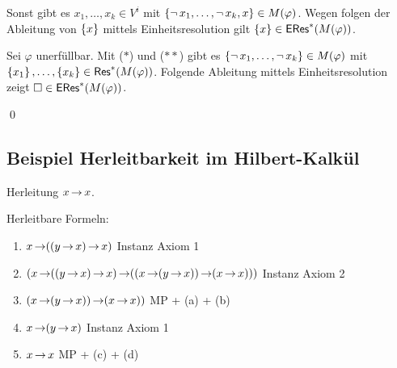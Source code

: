 \begin{description}
\begin{description}
    Sonst gibt es $x_1,\dots,x_k \in V^i$ mit $\left\{\operatorname{\neg} x_1,\dots,\operatorname{\neg} x_k,x\right\}\in M(\varphi)$.
    Wegen folgen der Ableitung von $\left\{x\right\}$ mittels Einheitsresolution gilt
    $\left\{x\right\}\in \operatorname{\text{\textsf{ERes}}}^*(M(\varphi))$.
    
    \begin{center}
    \end{center}
    
    Sei $\varphi$ unerfüllbar. Mit ($*$) und ($**$) gibt es
    $\left\{\operatorname{\neg} x_1,\dots,\operatorname{\neg} x_k\right\}\in M(\varphi)$ mit
    $\left\{x_1\right\},\dots,\left\{x_k\right\}\in\operatorname{\text{\textsf{Res}}}^*(M(\varphi))$.
    Folgende Ableitung mittels Einheitsresolution zeigt
    $\square\in\operatorname{\text{\textsf{ERes}}}^*(M(\varphi))$.
    
    \begin{center}
    \end{center}
    \qed
  \end{description}
\end{description}

\subsection{Beispiel Herleitbarkeit im Hilbert-Kalkül}

Herleitung $x \operatorname{\rightarrow} x$.

Herleitbare Formeln:
\begin{enumerate}[label=(\alph*)]
  \item $x \operatorname{\rightarrow} ((y\operatorname{\rightarrow} x)\operatorname{\rightarrow} x)$                                           \hfill Instanz Axiom 1
  \item $(x\operatorname{\rightarrow}((y\operatorname{\rightarrow} x)\operatorname{\rightarrow} x)\operatorname{\rightarrow}((x\operatorname{\rightarrow}(y\operatorname{\rightarrow} x))\operatorname{\rightarrow}(x\operatorname{\rightarrow} x)))$   \hfill Instanz Axiom 2
  \item $(x\operatorname{\rightarrow}(y\operatorname{\rightarrow} x))\operatorname{\rightarrow} (x\operatorname{\rightarrow} x))$                                   \hfill MP + (a) + (b)
  \item $x\operatorname{\rightarrow}(y\operatorname{\rightarrow} x)$                                                      \hfill Instanz Axiom 1
  \item $x\operatorname{\rightarrow} x$                                                              \hfill MP + (c) + (d)
\end{enumerate}

